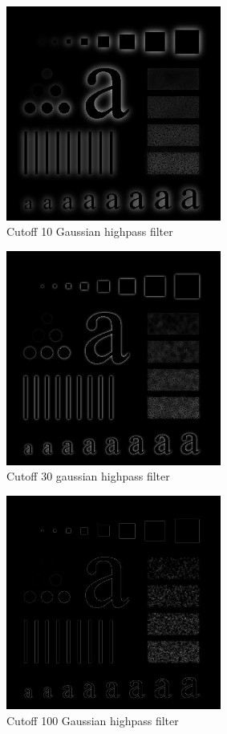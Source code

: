 \documentclass[10pt]{article}
\begin{document}
\begin{figure}[!ht]
	\centering
	\includegraphics[height=200pt]{./ex3/ch_gauss_high_10.jpg}
	\caption{Cutoff 10 Gaussian highpass filter}
\end{figure}
\begin{figure}[!ht]
	\centering
	\includegraphics[height=200pt]{./ex3/ch_gauss_high_30.jpg}
	\caption{Cutoff 30 gaussian highpass filter}
\end{figure}
\begin{figure}[!ht]
	\centering
	\includegraphics[height=200pt]{./ex3/ch_gauss_high_100.jpg}
	\caption{Cutoff 100 Gaussian highpass filter}
\end{figure}
\clearpage
\end{document}
